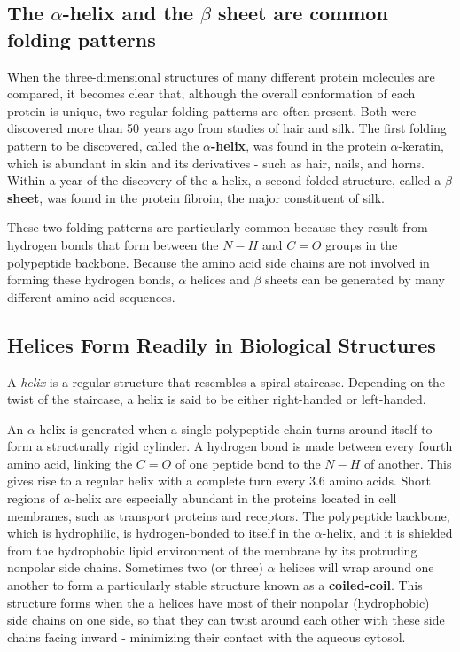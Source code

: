 \subsection{The $\alpha$-helix and the $\beta$ sheet are common folding patterns}

When the three-dimensional structures of many different protein molecules
are compared, it becomes clear that, although the overall
conformation of each protein is unique, two regular folding patterns are
often present. Both were discovered more than 50 years ago from studies
of hair and silk. The first folding pattern to be discovered, called the
\textbf{$\alpha$-helix}, was found in the protein $\alpha$-keratin, which is abundant in skin and
its derivatives - such as hair, nails, and horns. Within a year of the discovery
of the a helix, a second folded structure, called a \textbf{$\beta$ sheet}, was found
in the protein fibroin, the major constituent of silk.

These two folding patterns are particularly common because they result
from hydrogen bonds that form between the $N-H$ and $C=O$ groups in
the polypeptide backbone. Because the amino acid side chains are not
involved in forming these hydrogen bonds, $\alpha$ helices and $\beta$ sheets can
be generated by many different amino acid sequences.

\subsection{Helices Form Readily in Biological Structures}

A \textit{helix} is a regular structure that resembles a spiral staircase.
Depending on the twist of the staircase, a helix is said to be either
right-handed or left-handed.

An $\alpha$-helix is generated when a single polypeptide chain turns around
itself to form a structurally rigid cylinder. A hydrogen bond is made
between every fourth amino acid, linking the $C=O$ of one peptide bond to
the $N-H$ of another. This gives rise to a regular helix
with a complete turn every 3.6 amino acids.
Short regions of $\alpha$-helix are especially abundant in the proteins located
in cell membranes, such as transport proteins and receptors.
The polypeptide backbone, which is hydrophilic, is hydrogen-bonded to itself in
the $\alpha$-helix, and it is shielded
from the hydrophobic lipid environment of the membrane by its protruding nonpolar side chains.
Sometimes two (or three) $\alpha$ helices will wrap around one another to
form a particularly stable structure known as a \textbf{coiled-coil}. This structure
forms when the a helices have most of their nonpolar (hydrophobic)
side chains on one side, so that they can twist around each other with
these side chains facing inward - minimizing their contact with the aqueous cytosol.

